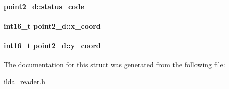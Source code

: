 \paragraph[{\texorpdfstring{status\+\_\+code}{status_code}}]{ point2\+\_\+d\+::status\+\_\+code}\hypertarget{structpoint2__d_ac4b500addb03876aad385716669899fd}{}\label{structpoint2__d_ac4b500addb03876aad385716669899fd}
\paragraph[{\texorpdfstring{x\+\_\+coord}{x_coord}}]{\setlength{\rightskip}{0pt plus 5cm}int16\+\_\+t point2\+\_\+d\+::x\+\_\+coord}\hypertarget{structpoint2__d_ace7ebdd2a9d9558104cbddcaf0cbd1ba}{}\label{structpoint2__d_ace7ebdd2a9d9558104cbddcaf0cbd1ba}
\paragraph[{\texorpdfstring{y\+\_\+coord}{y_coord}}]{\setlength{\rightskip}{0pt plus 5cm}int16\+\_\+t point2\+\_\+d\+::y\+\_\+coord}\hypertarget{structpoint2__d_aee96b403bc3c20867009b8fcddac3399}{}\label{structpoint2__d_aee96b403bc3c20867009b8fcddac3399}


The documentation for this struct was generated from the following file\+:\begin{DoxyCompactItemize}
\item 
\hyperlink{ilda__reader_8h}{ilda\+\_\+reader.\+h}\end{DoxyCompactItemize}
